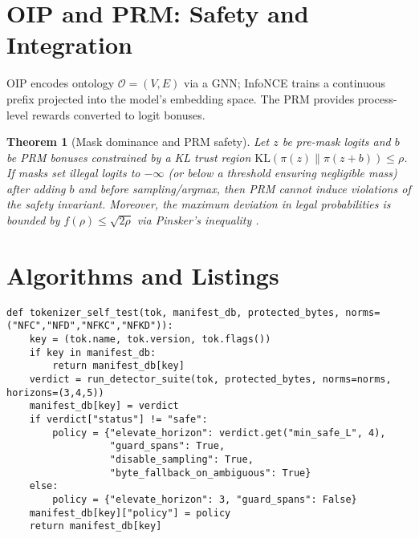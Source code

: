 \documentclass{article}
\newtheorem{theorem}{Theorem}
\begin{document}
\section{OIP and PRM: Safety and Integration}
OIP encodes ontology $\mathcal{O}=(V,E)$ via a GNN; InfoNCE trains a continuous prefix projected into the model’s embedding space. The PRM provides process-level rewards converted to logit bonuses.

\begin{theorem}[Mask dominance and PRM safety]\label{thm:prm}
Let $z$ be pre-mask logits and $b$ be PRM bonuses constrained by a KL trust region $\mathrm{KL}(\pi(z)\|\pi(z+b))\le \rho$. If masks set illegal logits to $-\infty$ (or below a threshold ensuring negligible mass) after adding $b$ and before sampling/argmax, then PRM cannot induce violations of the safety invariant. Moreover, the maximum deviation in legal probabilities is bounded by $f(\rho)\le\sqrt{2\rho}$ via Pinsker’s inequality \cite{csiszar2011it}.
\end{theorem}

\section{Algorithms and Listings}
\begin{lstlisting}[style=py, caption={Tokenizer self-test and verdict cache with cross-lingual adversarial contexts.}]
def tokenizer_self_test(tok, manifest_db, protected_bytes, norms=("NFC","NFD","NFKC","NFKD")):
    key = (tok.name, tok.version, tok.flags())
    if key in manifest_db: 
        return manifest_db[key]
    verdict = run_detector_suite(tok, protected_bytes, norms=norms, horizons=(3,4,5))
    manifest_db[key] = verdict
    if verdict["status"] != "safe":
        policy = {"elevate_horizon": verdict.get("min_safe_L", 4),
                  "guard_spans": True,
                  "disable_sampling": True,
                  "byte_fallback_on_ambiguous": True}
    else:
        policy = {"elevate_horizon": 3, "guard_spans": False}
    manifest_db[key]["policy"] = policy
    return manifest_db[key]
\end{lstlisting}
\end{document}
